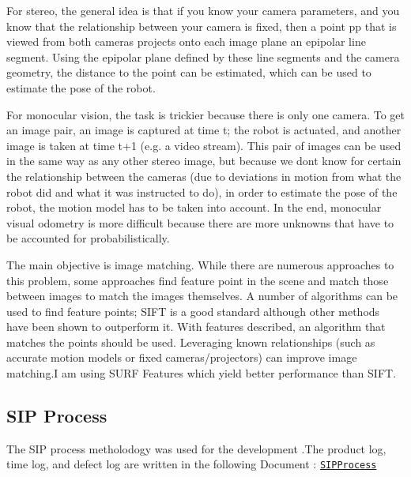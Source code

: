 For stereo, the general idea is that if you know your camera parameters, and you know that the relationship between your camera is fixed, then a point pp that is viewed from both cameras projects onto each image plane an epipolar line segment. Using the epipolar plane defined by these line segments and the camera geometry, the distance to the point can be estimated, which can be used to estimate the pose of the robot.

For monocular vision, the task is trickier because there is only one camera. To get an image pair, an image is captured at time t; the robot is actuated, and another image is taken at time t+1 (e.\+g. a video stream). This pair of images can be used in the same way as any other stereo image, but because we don\textquotesingle{}t know for certain the relationship between the cameras (due to deviations in motion from what the robot did and what it was instructed to do), in order to estimate the pose of the robot, the motion model has to be taken into account. In the end, monocular visual odometry is more difficult because there are more unknowns that have to be accounted for probabilistically.

The main objective is image matching. While there are numerous approaches to this problem, some approaches find feature point in the scene and match those between images to match the images themselves. A number of algorithms can be used to find feature points; S\+I\+FT is a good standard although other methods have been shown to outperform it. With features described, an algorithm that matches the points should be used. Leveraging known relationships (such as accurate motion models or fixed cameras/projectors) can improve image matching.\+I am using S\+U\+RF Features which yield better performance than S\+I\+FT.

\subsection*{S\+IP Process}

The S\+IP process metholodogy was used for the development .The product log, time log, and defect log are written in the following Document \+: \href{https://docs.google.com/spreadsheets/d/1RSP75a3Ezs6S3T3I84Ec1m85p-fogS6JML_CMYmCvE4/edit?usp=sharing}{\tt S\+I\+P\+Process}


